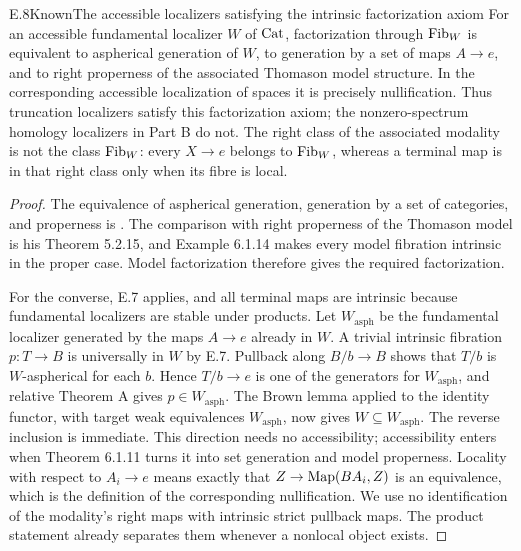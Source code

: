 \begin{claim}{E.8}{Known}{The accessible localizers satisfying the intrinsic factorization axiom}
For an accessible fundamental localizer $W$ of $\mathrm{Cat}$, factorization through $\mathrm{Fib}_W$ is equivalent to aspherical generation of $W$, to generation by a set of maps $A\to e$, and to right properness of the associated Thomason model structure. In the corresponding accessible localization of spaces it is precisely nullification. Thus truncation localizers satisfy this factorization axiom; the nonzero-spectrum homology localizers in Part B do not. The right class of the associated modality is not the class $\mathrm{Fib}_W$: every $X\to e$ belongs to $\mathrm{Fib}_W$, whereas a terminal map is in that right class only when its fibre is local.
\end{claim}
\begin{proof}
The equivalence of aspherical generation, generation by a set of categories, and properness is \citet[Theorem 6.1.11]{BCCisinski2006}. The comparison with right properness of the Thomason model is his Theorem 5.2.15, and Example 6.1.14 makes every model fibration intrinsic in the proper case. Model factorization therefore gives the required factorization.

For the converse, E.7 applies, and all terminal maps are intrinsic because fundamental localizers are stable under products. Let $W_{\mathrm{asph}}$ be the fundamental localizer generated by the maps $A\to e$ already in $W$. A trivial intrinsic fibration $p:T\to B$ is universally in $W$ by E.7. Pullback along $B/b\to B$ shows that $T/b$ is $W$-aspherical for each $b$. Hence $T/b\to e$ is one of the generators for $W_{\mathrm{asph}}$, and relative Theorem A gives $p\in W_{\mathrm{asph}}$. The Brown lemma applied to the identity functor, with target weak equivalences $W_{\mathrm{asph}}$, now gives $W\subseteq W_{\mathrm{asph}}$. The reverse inclusion is immediate. This direction needs no accessibility; accessibility enters when Theorem 6.1.11 turns it into set generation and model properness. Locality with respect to $A_i\to e$ means exactly that $Z\to\mathrm{Map}(BA_i,Z)$ is an equivalence, which is the definition of the corresponding nullification. We use no identification of the modality's right maps with intrinsic strict pullback maps. The product statement already separates them whenever a nonlocal object exists.
\end{proof}

